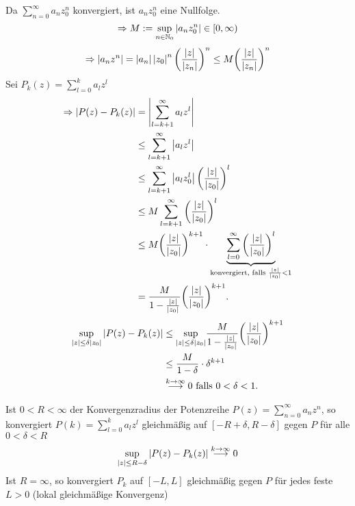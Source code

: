 \documentclass[../ana1.tex]{subfiles}
\begin{document}
\begin{bew}
    Da \( \sum_{n=0}^\infty a_n z_0^n \) konvergiert, ist 
    \( a_n z_0^n \) eine Nullfolge.
    \[ \Rightarrow M := \underset{n\in\mathbb{N}_0}{\sup} 
    \left|a_n z_0^n\right| \in [0,\infty) \]
    \[ \Rightarrow \left|a_n z^n\right| = \left|a_n\right| \left|z_0\right|^n 
    {\left(\frac{\left|z\right|}{\left|z_n\right|}\right)}^n 
    \leq M {\left(\frac{\left|z\right|}{\left|z_n\right|}\right)}^n \]
    Sei \( P_k(z) = \sum_{l=0}^k a_l z^l \)
    \begin{align*}
        \Rightarrow \left| P(z) - P_k(z) \right| 
        &= \left| \sum_{l=k+1}^\infty a_l z^l \right| \\
        &\leq \sum_{l=k+1}^\infty \left|a_l z^l\right| \\
        &\leq \sum_{l=k+1}^\infty \left| a_l z_0^l \right| 
        {\left( \frac{\left|z\right|}{\left|z_0\right|} \right)}^l \\
        &\leq M \sum_{l=k+1}^\infty 
        {\left( \frac{\left|z\right|}{\left|z_0\right|} \right)}^l \\
        &\leq M {\left( \frac{\left|z\right|}{\left|z_0\right|} \right)}^{k+1} 
        \cdot \underbrace{\sum_{l=0}^\infty 
        {\left( \frac{\left|z\right|}{\left|z_0\right|} \right)}^l}_{
            \text{konvergiert, falls } \frac{\left|z\right|}{\left|z_0\right|} < 1
        }\\
        &= \frac{ M }{ 1-\frac{\left|z\right|}{\left|z_0\right|} } 
        {\left( \frac{\left|z\right|}{\left|z_0\right|} \right)}^{k+1}.
    \end{align*}
    \begin{align*} 
        \underset{\left|z\right| \leq \delta \left|z_0\right|}{\sup} 
        \left|P(z) - P_k(z)\right| 
        &\leq \underset{\left|z\right| \leq \delta \left|z_0\right|}{\sup} 
        \frac{ M }{ 1 - \frac{\left|z\right|}{\left|z_0\right|} } 
        {\left( \frac{\left|z\right|}{\left|z_0\right|} \right)}^{k+1}\\
        &\leq \frac{M}{1-\delta} \cdot \delta^{k+1}\\
        &\overset{k\rightarrow\infty}{\longrightarrow} 0 
        \text{ falls } 0 < \delta < 1.
    \end{align*}
\end{bew}
\begin{bem}
    Ist \(0 < R < \infty \) der Konvergenzradius der Potenzreihe 
    \(P(z) = \sum_{n=0}^{\infty} a_n z^n \), so konvergiert
    \(P(k) = \sum_{l=0}^{k} a_l z^l \) gleichmäßig auf
    \([-R + \delta, R - \delta] \) gegen \( P \) für alle 
    \( 0 < \delta < R \)
    \[ \underset{\left|z\right| \leq R-\delta}{\sup} \left|P(z)-P_k(z)\right|
    \overset{k \rightarrow \infty}{\longrightarrow} 0 \]
    Ist \( R = \infty \), so konvergiert \( P_k \) auf 
    \( [-L,L] \) gleichmäßig gegen \( P \) für jedes feste
    \( L > 0 \) (lokal gleichmäßige Konvergenz)
\end{bem}
\end{document}

